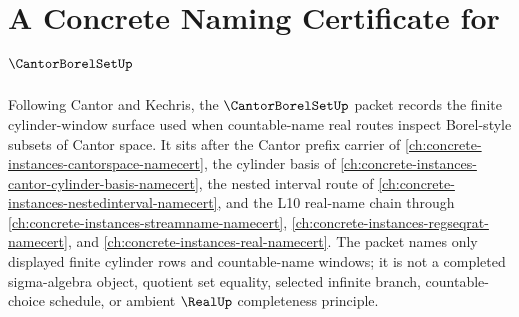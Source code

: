 \chapter{A Concrete Naming Certificate for $\CantorBorelSetUp$}
\label{ch:concrete-instances-cantor-borel-set-namecert}

Following Cantor and Kechris, the $\CantorBorelSetUp$ packet records the finite cylinder-window surface used when countable-name real routes inspect Borel-style subsets of Cantor space. It sits after the Cantor prefix carrier of \autoref{ch:concrete-instances-cantorspace-namecert}, the cylinder basis of \autoref{ch:concrete-instances-cantor-cylinder-basis-namecert}, the nested interval route of \autoref{ch:concrete-instances-nestedinterval-namecert}, and the L10 real-name chain through \autoref{ch:concrete-instances-streamname-namecert}, \autoref{ch:concrete-instances-regseqrat-namecert}, and \autoref{ch:concrete-instances-real-namecert}. The packet names only displayed finite cylinder rows and countable-name windows; it is not a completed sigma-algebra object, quotient set equality, selected infinite branch, countable-choice schedule, or ambient $\RealUp$ completeness principle.

